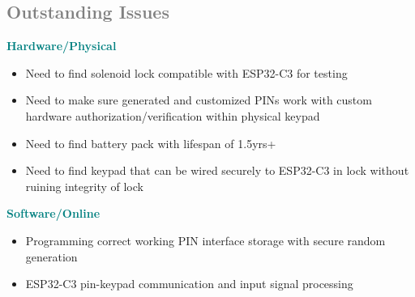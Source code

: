 \subsection{\textcolor{gray}{Outstanding Issues}}
\textcolor{teal}{\textbf{Hardware/Physical}}
\begin{itemize}
    \item Need to find solenoid lock compatible with ESP32-C3 for testing
    \item Need to make sure generated and customized PINs work with custom hardware authorization/verification within physical keypad
     \item Need to find battery pack with lifespan of 1.5yrs+
     \item Need to find keypad that can be wired securely to ESP32-C3 in lock without ruining integrity of lock
\end{itemize}
\textcolor{teal}{\textbf{Software/Online}}
\begin{itemize}

     \item Programming correct working PIN interface storage with secure random generation
     \item ESP32-C3 pin-keypad communication and input signal processing
    
\end{itemize}